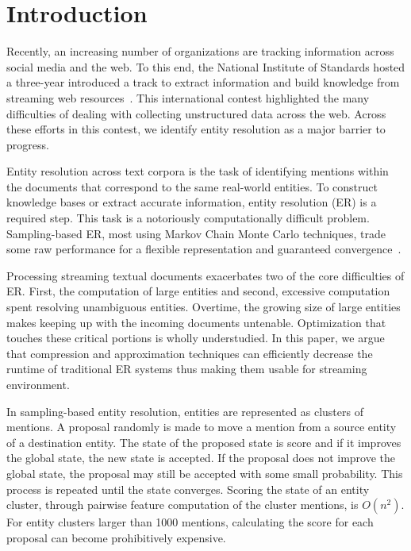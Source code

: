 
\section{Introduction}

Recently, an increasing number of organizations are tracking information across
social media and the web.
To this end, the National Institute of Standards hosted a three-year
introduced a track to extract information and build knowledge from streaming web
resources~\cite{frank2013evaluating}.
This international contest highlighted the many difficulties of dealing with collecting 
unstructured data across the web.
Across these efforts in this contest, we identify entity resolution as a major barrier to progress. 


Entity resolution across text corpora is the task of identifying mentions 
within the documents that correspond to the same real-world entities.
To construct knowledge bases or extract accurate information, entity resolution (ER) is a required step.
This task is a notoriously computationally difficult problem.
Sampling-based ER, most using Markov Chain Monte Carlo techniques, trade some raw performance for a flexible representation 
and guaranteed convergence~\cite{mccallum03towardconditional,singh2011large,wick2013discriminative}.

Processing streaming textual documents exacerbates two of the core difficulties of ER.\@
First, the computation of large entities and second, excessive
computation spent resolving unambiguous entities.
Overtime, the growing size of large entities makes keeping up with the incoming documents untenable.
Optimization that touches these critical portions is wholly understudied.
In this paper, we argue that compression and approximation 
techniques can efficiently decrease the runtime of traditional ER systems thus
making them usable for streaming environment.

In sampling-based entity resolution, entities are represented as clusters of mentions.
A proposal randomly is made to move a mention from a source entity of a destination entity.
The state of the proposed state is score and if it improves the global state, the new state is accepted.
If the proposal does not improve the global state, the proposal may still be accepted with some small probability.
This process is repeated until the state converges.
Scoring the state of an entity cluster, through pairwise feature computation of the cluster mentions, is $O(n^2)$.
For entity clusters larger than 1000 mentions, calculating the score for each proposal can become prohibitively expensive.

